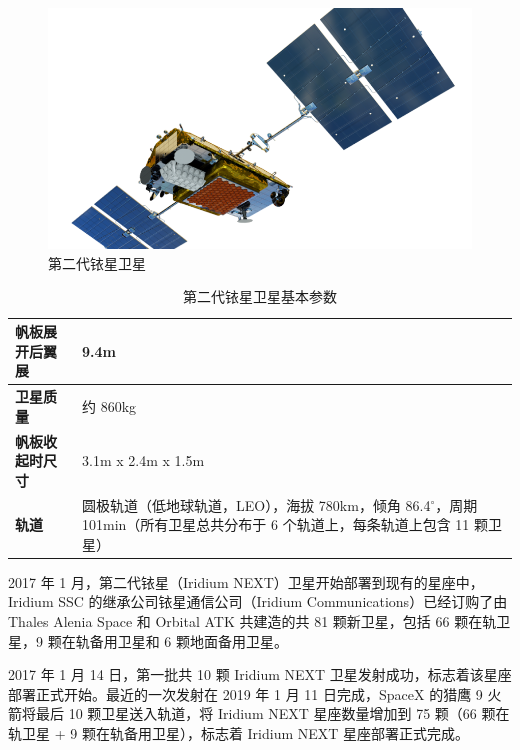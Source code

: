\begin{enumerate}
    \begin{figure}[htbp]
    \centering
    \includegraphics[width=13cm]{pic/IMG_Iridium-Satellite_NEXT-Satellite-Vehicle_HR_FEB16-clip-833x474.png}
    \caption{第二代铱星卫星}
    \label{fig:IMG_Iridium-Satellite_NEXT-Satellite-Vehicle}
    \end{figure}

    \renewcommand\arraystretch{1.5}
    \begin{table}[htbp]
    \centering
    \caption{第二代铱星卫星基本参数}
    \label{tab:iridium_next_paras}
    \begin{tabular}[b]{|p{4cm}<{\raggedleft}|p{8cm}<{\raggedright}|}
    \hline
    \textbf{帆板展开后翼展} & 9.4m \\
    \hline
    \textbf{卫星质量} & 约 860kg\\
    \hline
    \textbf{帆板收起时尺寸}& 3.1m x 2.4m x 1.5m \\
    \hline
    \textbf{轨道} & 圆极轨道（低地球轨道，LEO），海拔 780km，倾角 86.4$^\circ$，周期 101min（所有卫星总共分布于 6 个轨道上，每条轨道上包含 11 颗卫星）\\
    \hline
    \end{tabular}
    \end{table}

    2017 年 1 月，第二代铱星（Iridium NEXT）卫星开始部署到现有的星座中，Iridium SSC 的继承公司铱星通信公司（Iridium Communications）已经订购了由 Thales Alenia Space 和 Orbital ATK 共建造的共 81 颗新卫星，包括 66 颗在轨卫星，9 颗在轨备用卫星和 6 颗地面备用卫星。

    2017 年 1 月 14 日，第一批共 10 颗 Iridium NEXT 卫星发射成功，标志着该星座部署正式开始。最近的一次发射在 2019 年 1 月 11 日完成，SpaceX 的猎鹰 9 火箭将最后 10 颗卫星送入轨道，将 Iridium NEXT 星座数量增加到 75 颗（66 颗在轨卫星 + 9 颗在轨备用卫星），标志着 Iridium NEXT 星座部署正式完成。


\end{enumerate}
